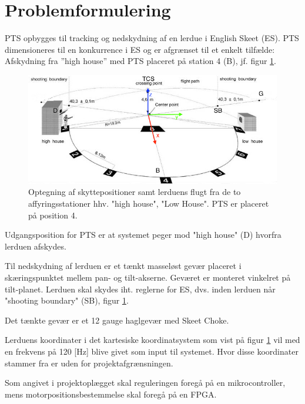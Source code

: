 \section{Problemformulering}
\label{sec:problemformulering}

PTS opbygges til tracking og nedskydning af en lerdue i English Skeet (ES). PTS dimensioneres til en konkurrence i ES og er afgrænset til et enkelt tilfælde:
Afskydning fra ”high house” med PTS placeret på station 4 (B), jf. figur \ref{fig:ES}.
\begin{figure}[th!]
\centering
\includegraphics[width=1\textwidth]{./graphics/skeet_diagram_cropped_axes}
\caption[Skitse af ES]{Optegning af skyttepositioner samt lerduens flugt fra de to affyringsstationer hhv. "high house", "Low House". PTS er placeret på position 4.}
\label{fig:ES}
\end{figure}	

Udgangsposition for PTS er at systemet peger mod "high house" (D) hvorfra lerduen afskydes.

Til nedskydning af lerduen er et tænkt masseløst gevær placeret i skæringspunktet mellem pan- og tilt-akserne.
Geværet er monteret vinkelret på tilt-planet. 
Lerduen skal skydes iht. reglerne for ES, dvs. inden lerduen når "shooting boundary" (SB), figur \ref{fig:ES}.

Det tænkte gevær er et 12 gauge haglgevær med Skeet Choke.

Lerduens koordinater i det kartesiske koordinatsystem som vist på figur \ref{fig:ES}
vil med en frekvens på 120 [Hz] blive givet som input til systemet. 
Hvor disse koordinater stammer fra er uden for projektafgrænsningen.

Som angivet i projektoplægget skal reguleringen foregå på en mikrocontroller,
mens motorpositionsbestemmelse skal foregå på en FPGA.